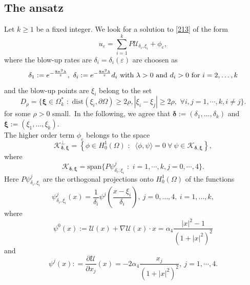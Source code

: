 \documentclass[11pt,a4paper]{amsart}
\newcommand{\e}{\varepsilon}
\renewcommand{\d }{\delta }
\newcommand{\Ua}{{\mathcal{U}}}
\newcommand{\Ui}{{\mathcal{U}_{\delta_i, \xi_i}}}
\theoremstyle{definition}
\renewcommand{\(}{\left(}
\renewcommand{\)}{\right)}
\begin{document}
\subsection{The ansatz} 
Let $k \geq 1$ be a fixed integer. We look for a solution to \eqref{213} of the form 
\begin{equation}\label{soluzione}
u_\e = \sum_{i=1}^{k} P\Ui+\phi_\e, 
\end{equation}
where the blow-up rates are $\delta_{i}=\delta_{i}(\varepsilon) $ are choosen as
\begin{equation}\label{delta}
\delta_1:=e^{-\frac{8\pi^2 \lambda}{ \e}},\ \d_i:=e^{-\frac{8\pi^2 \lambda}{ \e}}d_i\ \hbox{with}\ \lambda>0\ \hbox{and}\
 d_i>0\ \hbox{for}\  i=2, \ldots, k
\end{equation}  
and the blow-up points are $\xi_{i}$ belong to the set
\begin{equation*}
D_\rho = \{ \pmb{\xi} \in \Omega^{*}_k\,\,:\,\, \mbox{dist}(\xi_{i}, \partial \Omega) \geq 2\rho, |\xi_{i} - \xi_{j}| \geq 2\rho,\,\, \forall i,j = 1, \cdots, k, i \neq j \}.
\end{equation*} for some $\rho>0$ small.\
In the following, we agree that $\boldsymbol \delta:=(\delta_1,\dots,\delta_k)$ and $\boldsymbol \xi:=(\xi_1,\dots,\xi_k).$\\
The higher order term  $\phi_\e$ belongs to the space  
\begin{equation*}
\mathcal K^{\perp}_{\pmb{\d}, \pmb{\xi}} =\left \{ \phi \in H^{1}_{0}(\Omega)\,\, :\,\,\ \langle \phi, \psi \rangle = 0\ \forall\ \psi\in \mathcal K_{\pmb{\d}, \pmb{\xi}}\right\},
\end{equation*}
where
\begin{equation*}
\mathcal K_{\pmb{\d}, \pmb{\xi}} = \mbox{span} \{ P \psi_{\delta_{i}, \xi_{i}}^{j}\,\, :\,\, i= 1, \cdots, k, j=0, \cdots, 4\}.
\end{equation*}
Here $P\psi_{\delta_{i}, \xi_{i}}^{j}$ are the orthogonal projections onto $H^1_0(\Omega)$ of the functions
\begin{equation*}
\psi_{\delta_{i}, \xi_{i}}^{j}(x) = \frac{1}{\delta_{i}} \psi^{j} \left(\frac{x-\xi_{i}}{\delta_{i}} \right),\   j=0, \ldots, 4,\ i=1, \ldots, k,
\end{equation*}
where 
\begin{equation*}
\psi^{0}(x) := \Ua(x) + \nabla \Ua(x) \cdot x  = \alpha_4 \frac{|x|^{2}-1}{(1+|x|^{2})^{2}}
\end{equation*}
and 
\begin{equation*}
\psi^{j}(x) : = \frac{\partial \Ua}{\partial x_{j}}(x) = -2\alpha_4 \frac{x_{j}}{(1+|x|^{2})^{2}}, \  j=1, \cdots, 4.
\end{equation*}
\end{document}
